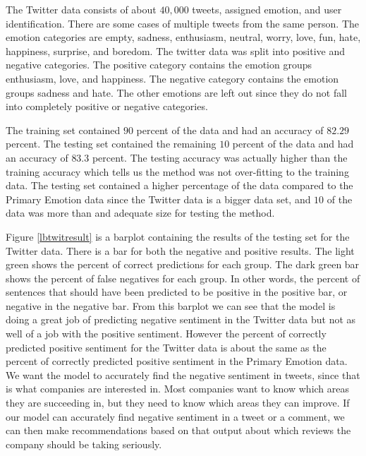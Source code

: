 \documentclass[titlepage,letterpaper]{article}
\begin{document}
The Twitter data consists of about $40,000$ tweets, assigned emotion, and user identification. There are some cases of multiple tweets from the same person. The emotion categories are empty, sadness, enthusiasm, neutral, worry, love, fun, hate, happiness, surprise, and boredom. The twitter data was split into positive and negative categories. The positive category contains the emotion groups enthusiasm, love, and happiness. The negative category contains the emotion groups sadness and hate. The other emotions are left out since they do not fall into completely positive or negative categories. 

The training set contained $90$ percent of the data and had an accuracy of $82.29$ percent. The testing set contained the remaining $10$ percent of the data and had an accuracy of $83.3$ percent. The testing accuracy was actually higher than the training accuracy which tells us the method was not over-fitting to the training data. The testing set contained a higher percentage of the data compared to the Primary Emotion data since the Twitter data is a bigger data set, and $10$ of the data was more than and adequate size for testing the method. 

Figure \ref{lbtwitresult} is a barplot containing the results of the testing set for the Twitter data. There is a bar for both the negative and positive results. The light green shows the percent of correct predictions for each group. The dark green bar shows the percent of false negatives for each group. In other words, the percent of sentences that should have been predicted to be positive in the positive bar, or negative in the negative bar. From this barplot we can see that the model is doing a great job of predicting negative sentiment in the Twitter data but not as well of a job with the positive sentiment. However the percent of correctly predicted positive sentiment for the Twitter data is about the same as the percent of correctly predicted positive sentiment in the Primary Emotion data. We want the model to accurately find the negative sentiment in tweets, since that is what companies are interested in. Most companies want to know which areas they are succeeding in, but they need to know which areas they can improve. If our model can accurately find negative sentiment in a tweet or a comment, we can then make recommendations based on that output about which reviews the company should be taking seriously. 

\end{document}
